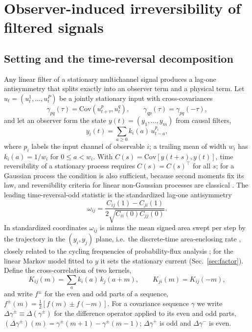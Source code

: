 \section{Observer-induced irreversibility of filtered signals}\label{sec:theory}

\subsection{Setting and the time-reversal decomposition}\label{sec:decomp}

Any linear filter of a stationary multichannel signal produces a lag-one antisymmetry that splits exactly into an observer term and a physical term. Let $u_t=(u^1_t,\dots,u^P_t)$ be a jointly stationary input with cross-covariances
\begin{equation}
\gamma_{pq}(\tau)=\mathrm{Cov}(u^p_{t+\tau},u^q_t),\qquad \gamma_{qp}(\tau)=\gamma_{pq}(-\tau),
\end{equation}
and let an observer form the state $y(t)=(y_1,\dots,y_m)$ from causal filters,
\begin{equation}
y_i(t)=\sum_{a\ge0}k_i(a)\,u^{p_i}_{t-a},
\end{equation}
where $p_i$ labels the input channel of observable $i$; a trailing mean of width $w_i$ has $k_i(a)=1/w_i$ for $0\le a<w_i$. With $C(s)=\mathrm{Cov}[y(t+s),y(t)]$, time reversibility of a stationary process requires $C(s)=C(s)^\top$ for all $s$; for a Gaussian process the condition is also sufficient, because second moments fix its law, and reversibility criteria for linear non-Gaussian processes are classical \cite{weiss1975,tong2005,chan2006}. The leading time-reversal-odd statistic is the standardized lag-one antisymmetry
\begin{equation}
\omega_{ij}=\frac{C_{ij}(1)-C_{ji}(1)}{2\sqrt{C_{ii}(0)C_{jj}(0)}} .\label{eq:omega}
\end{equation}
In standardized coordinates $\omega_{ij}$ is minus the mean signed area swept per step by the trajectory in the $(y_i,y_j)$ plane, i.e.\ the discrete-time area-enclosing rate \cite{ghanta2017,gonzalez2019}, closely related to the cycling frequencies of probability-flux analysis \cite{gradziuk2019,battle2016}; for the linear Markov model fitted to $y$ it sets the stationary current (Sec.~\ref{sec:factor}). Define the cross-correlation of two kernels,
\begin{equation}
K_{ij}(m)=\sum_a k_i(a)\,k_j(a+m),\qquad K_{ji}(m)=K_{ij}(-m),
\end{equation}
and write $f^\pm$ for the even and odd parts of a sequence, $f^\pm(m)=\tfrac12[f(m)\pm f(-m)]$. For a covariance sequence $\gamma$ we write $\Delta\gamma^\pm\equiv\Delta(\gamma^\pm)$ for the difference operator applied to its even and odd parts, $(\Delta\gamma^\pm)(m)=\gamma^\pm(m+1)-\gamma^\pm(m-1)$; $\Delta\gamma^+$ is odd and $\Delta\gamma^-$ is even.


